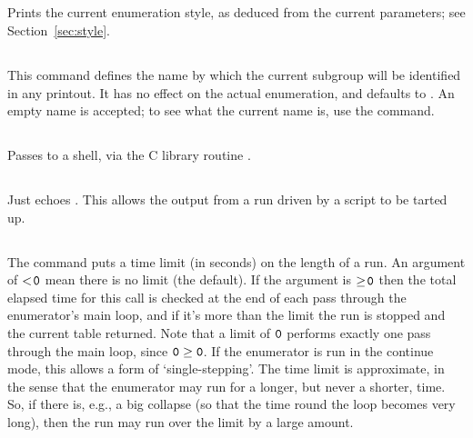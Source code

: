 \subsection{}

Prints the current enumeration style, as deduced from the current 
  \amp {} parameters; see Section~\ref{sec:style}.

\subsection{}

This command defines the name by which the current subgroup will be
  identified in any printout.
It has no effect on the actual enumeration, and defaults to .
An empty name is accepted; to see what the current name is, use the
   command.

\subsection{}

Passes  to a shell, via the C library routine .

\subsection{}

Just echoes .
This allows the output from a run driven by a script to be tarted up.

\subsection{}

The  command puts a time limit (in seconds) on the length of a run.
An argument of $<\!\texttt{0}$ mean there is no limit (the default).
If the argument is $\ge\!\texttt{0}$ then the total elapsed time for this
  call is checked at the end of each pass through the enumerator's main
  loop, and if it's more than the limit the run is stopped and the current
  table returned.
Note that a limit of $\texttt{0}$ performs exactly one pass through the main
  loop, since $\texttt{0} \ge \texttt{0}$.
If the enumerator is run in the continue mode, this allows a form of
  `single-stepping'\kern-1.5pt.
%
The time limit is approximate, in the sense that the enumerator may run for
  a longer, but never a shorter, time.
So, if there is, e.g., a big collapse (so that the time round the loop
  becomes very long), then the run may run over the limit by a large
  amount.

